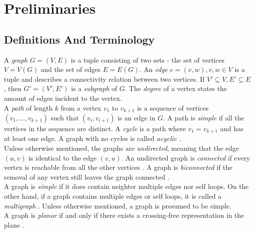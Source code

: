 \section{Preliminaries}

\subsection{Definitions And Terminology}
A \emph{graph} $G=(V,E)$ is a tuple consisting of two sets - the set of vertices $V=V(G)$ and the set of edges $E=E(G)$. An \emph{edge} $e = (v,w), v,w \in V$ is a tuple and describes a connectivity relation between two vertices.
If $V'\subseteq V, E'\subseteq E$, then $G' = (V',E')$ is a \emph{subgraph} of $G$.
The \emph{degree} of a vertex states the amount of edges incident to the vertex.\\
A \emph{path} of length $k$ from a vertex $v_1$ to $v_{k+1}$ is a sequence of vertices $(v_1,...,v_{k+1})$ such that $(v_i,v_{i+1})$ is an edge in $G$.  A path is \emph{simple} if all the vertices in the sequence are distinct. A \emph{cycle} is a path where $v_1 = v_{k+1}$ and has at least one edge. A graph with no cycles is called \emph{acyclic} \cite[P. 1170]{DBLP:cormen_intro_to_algorithms}.\\
Unless otherwise mentioned, the graphs are \emph{undirected}, meaning that the edge $(u,v)$ is identical to the edge $(v,u)$.
An undirected graph is \emph{connected} if every vertex is reachable from all the other vertices \cite[P. 1170]{DBLP:cormen_intro_to_algorithms}.
A graph is \emph{biconnected} if the removal of any vertex still leaves the graph connected \cite[P. 224]{Duncan_planar_polyline_drawings}.\\
A graph is \emph{simple} if it does contain neighter multiple edges nor self loops. On the other hand, if a graph contains multiple edges or self loops, it is called a \emph{multigraph} \cite[P. 1172]{DBLP:cormen_intro_to_algorithms}. Unless otherwise mentioned, a graph is presumed to be simple.\\
A graph is \emph{planar} if and only if there exists a crossing-free representation in the plane \cite[Page 100]{DBLP:cormen_intro_to_algorithms}.
